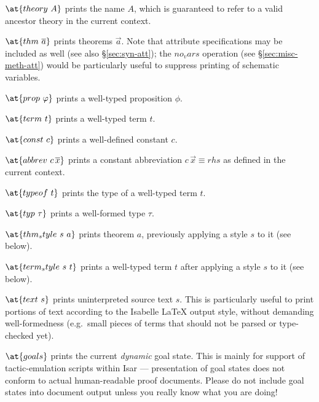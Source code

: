 \begin{descr}
  
\item [$\at\{theory~A\}$] prints the name $A$, which is guaranteed to
  refer to a valid ancestor theory in the current context.

\item [$\at\{thm~\vec a\}$] prints theorems $\vec a$. Note that attribute
  specifications may be included as well (see also \S\ref{sec:syn-att}); the
  $no_vars$ operation (see \S\ref{sec:misc-meth-att}) would be particularly
  useful to suppress printing of schematic variables.

\item [$\at\{prop~\phi\}$] prints a well-typed proposition $\phi$.

\item [$\at\{term~t\}$] prints a well-typed term $t$.

\item [$\at\{const~c\}$] prints a well-defined constant $c$.
  
\item [$\at\{abbrev~c\,\vec x\}$] prints a constant abbreviation
  $c\,\vec x \equiv rhs$ as defined in the current context.

\item [$\at\{typeof~t\}$] prints the type of a well-typed term $t$.

\item [$\at\{typ~\tau\}$] prints a well-formed type $\tau$.
  
\item [$\at\{thm_style~s~a\}$] prints theorem $a$, previously applying a style
  $s$ to it (see below).
  
\item [$\at\{term_style~s~t\}$] prints a well-typed term $t$ after applying a
  style $s$ to it (see below).

\item [$\at\{text~s\}$] prints uninterpreted source text $s$.  This is
  particularly useful to print portions of text according to the Isabelle
  {\LaTeX} output style, without demanding well-formedness (e.g.\ small pieces
  of terms that should not be parsed or type-checked yet).

\item [$\at\{goals\}$] prints the current \emph{dynamic} goal state.  This is
  mainly for support of tactic-emulation scripts within Isar --- presentation
  of goal states does not conform to actual human-readable proof documents.
  Please do not include goal states into document output unless you really
  know what you are doing!
  

\end{descr}
